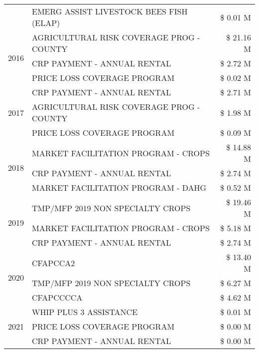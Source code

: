 \begin{tabular}{llr}
 & EMERG ASSIST LIVESTOCK BEES FISH (ELAP) & \$ 0.01 M \\
\cline{1-3}
\multirow[t]{3}{*}{2016} & AGRICULTURAL RISK COVERAGE PROG - COUNTY      & \$ 21.16 M \\
 & CRP PAYMENT - ANNUAL RENTAL                   & \$ 2.72 M \\
 & PRICE LOSS COVERAGE PROGRAM                   & \$ 0.02 M \\
\cline{1-3}
\multirow[t]{3}{*}{2017} & CRP PAYMENT - ANNUAL RENTAL & \$ 2.71 M \\
 & AGRICULTURAL RISK COVERAGE PROG - COUNTY & \$ 1.98 M \\
 & PRICE LOSS COVERAGE PROGRAM & \$ 0.09 M \\
\cline{1-3}
\multirow[t]{3}{*}{2018} & MARKET FACILITATION PROGRAM - CROPS & \$ 14.88 M \\
 & CRP PAYMENT - ANNUAL RENTAL & \$ 2.74 M \\
 & MARKET FACILITATION PROGRAM - DAHG & \$ 0.52 M \\
\cline{1-3}
\multirow[t]{3}{*}{2019} & TMP/MFP 2019 NON SPECIALTY CROPS & \$ 19.46 M \\
 & MARKET FACILITATION PROGRAM - CROPS & \$ 5.18 M \\
 & CRP PAYMENT - ANNUAL RENTAL & \$ 2.74 M \\
\cline{1-3}
\multirow[t]{3}{*}{2020} & CFAPCCA2 & \$ 13.40 M \\
 & TMP/MFP 2019 NON SPECIALTY CROPS & \$ 6.27 M \\
 & CFAPCCCCA & \$ 4.62 M \\
\cline{1-3}
\multirow[t]{3}{*}{2021} & WHIP PLUS 3 ASSISTANCE & \$ 0.01 M \\
 & PRICE LOSS COVERAGE PROGRAM & \$ 0.00 M \\
 & CRP PAYMENT - ANNUAL RENTAL & \$ 0.00 M \\
\cline{1-3}
\bottomrule
\end{tabular}
